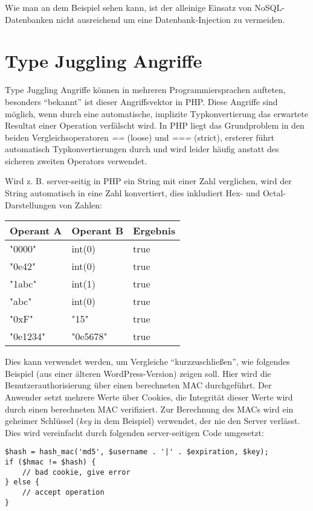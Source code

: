 Wie man an dem Beispiel sehen kann, ist der alleinige Einsatz von NoSQL-Datenbanken nicht ausreichend um eine Datenbank-Injection zu vermeiden.

\section{Type Juggling Angriffe}

Type Juggling Angriffe können in mehreren Programmiersprachen aufteten, besonders ``bekannt'' ist dieser Angriffsvektor in PHP. Diese Angriffe sind möglich, wenn durch eine automatische, implizite Typkonvertierung das erwartete Resultat einer Operation verfälscht wird. In PHP liegt das Grundproblem in den beiden Vergleichsoperatoren \textit{==} (loose) und \textit{===} (strict), ersterer führt automatisch Typkonvertierungen durch und wird leider häufig anstatt des sicheren zweiten Operators verwendet.

Wird z. B. server-seitig in PHP ein String mit einer Zahl verglichen, wird der String automatisch in eine Zahl konvertiert, dies inkludiert Hex- und Octal-Darstellungen von Zahlen:

\begin{tabularx}{\textwidth}{|X|X|X|}
	\hline
	Operant A & Operant B & Ergebnis \\
	\hline
	"0000" & int(0) & true \\
	"0e42" & int(0) & true \\
	"1abc" & int(1) & true \\
	"abc"  & int(0) & true \\
	"0xF"  & "15"   & true \\
	"0e1234" & "0e5678" & true \\
	\hline
\end{tabularx}

Dies kann verwendet werden, um Vergleiche ``kurzzuschließen'', wie folgendes Beispiel (aus einer älteren WordPress-Version) zeigen soll. Hier wird die Benutzerauthorisierung über einen berechneten MAC durchgeführt. Der Anwender setzt mehrere Werte über Cookies, die Integrität dieser Werte wird durch einen berechneten MAC verifiziert. Zur Berechnung des MACs wird ein geheimer Schlüssel (\textit{key} in dem Beispiel) verwendet, der nie den Server verlässt. Dies wird vereinfacht durch folgenden server-seitigen Code umgesetzt:

\begin{verbatim}
$hash = hash_mac('md5', $username . '|' . $expiration, $key);
if ($hmac != $hash) {
	// bad cookie, give error
} else {
	// accept operation
}
\end{verbatim}

